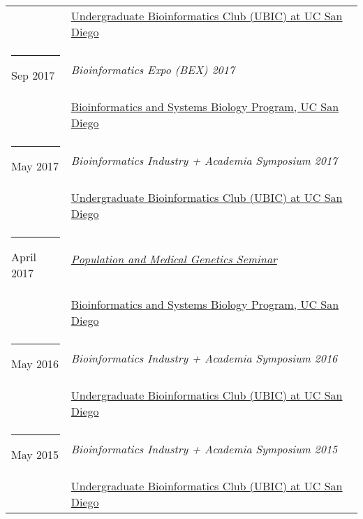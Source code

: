 \documentclass[margin,line]{res}
\begin{document}
\begin{resume}
\begin{longtable}{@{}p{0.7in}p{4in}}
\hspace*{-4mm} & \hspace{4mm} \href{http://ubicucsd.github.io/}{Undergraduate Bioinformatics Club (UBIC) at UC San Diego}\\
\hspace*{-4mm} \rule{-1mm}{5mm} Sep 2017 & \textit{Bioinformatics Expo (BEX) 2017}\\*
\hspace*{-4mm} & \hspace{4mm} \href{http://bioinformatics.ucsd.edu/}{Bioinformatics and Systems Biology Program, UC San Diego}\\
\hspace*{-4mm} \rule{-1mm}{5mm} May 2017 & \textit{Bioinformatics Industry + Academia Symposium 2017}\\*
\hspace*{-4mm} & \hspace{4mm} \href{http://ubicucsd.github.io/}{Undergraduate Bioinformatics Club (UBIC) at UC San Diego}\\
\hspace*{-4mm} \rule{-1mm}{5mm} April 2017 & \href{https://gymreklab.github.io/teaching/medpopgen_seminar.html}{\textit{Population and Medical Genetics Seminar}}\\*
\hspace*{-4mm} & \hspace{4mm} \href{http://ubicucsd.github.io/}{Bioinformatics and Systems Biology Program, UC San Diego}\\
\hspace*{-4mm} \rule{-1mm}{5mm} May 2016 & \textit{Bioinformatics Industry + Academia Symposium 2016}\\*
\hspace*{-4mm} & \hspace{4mm} \href{http://ubicucsd.github.io/}{Undergraduate Bioinformatics Club (UBIC) at UC San Diego}\\
\hspace*{-4mm} \rule{-1mm}{5mm} May 2015 & \textit{Bioinformatics Industry + Academia Symposium 2015}\\*
\hspace*{-4mm} & \hspace{4mm} \href{http://ubicucsd.github.io/}{Undergraduate Bioinformatics Club (UBIC) at UC San Diego}\\
\end{longtable}


\end{resume}
\end{document}
